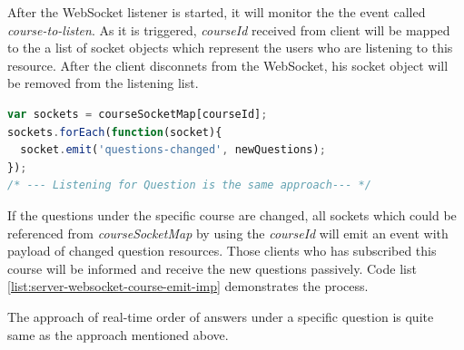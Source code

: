 After the WebSocket listener is started, it will monitor the the event called \textit{course-to-listen}. As it is triggered, \textit{courseId} received from client will be mapped to the a list of socket objects which represent the users who are listening to this resource. After the client disconnets from the WebSocket, his socket object will be removed from the listening list. 

\begin{lstlisting}[language=JavaScript, caption=Server starts listening for requests over WebSocket protocol , label={list:server-websocket-course-emit-imp}]
var sockets = courseSocketMap[courseId];
sockets.forEach(function(socket){
  socket.emit('questions-changed', newQuestions);
});
/* --- Listening for Question is the same approach--- */
\end{lstlisting}

If the questions under the specific course are changed, all sockets which could be referenced from \textit{courseSocketMap} by using the \textit{courseId} will emit an event with payload of changed question resources. Those clients who has subscribed this course will be informed and receive the new questions passively. Code list \ref{list:server-websocket-course-emit-imp} demonstrates the process.

The approach of real-time order of answers under a specific question is quite same as the approach mentioned above.